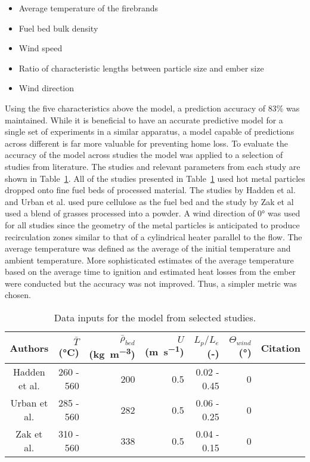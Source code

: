        \begin{itemize}
            \item Average temperature of the firebrands
            \item Fuel bed bulk density
            \item Wind speed
            \item Ratio of characteristic lengths between particle size and ember size
            \item Wind direction
        \end{itemize}
    Using the five characteristics above the model, a prediction accuracy of 83\% was maintained. While it is beneficial to have an accurate predictive model for a single set of experiments in a similar apparatus, a model capable of predictions across different is far more valuable for preventing home loss. To evaluate the accuracy of the model across studies the model was applied to a selection of studies from literature. The studies and relevant parameters from each study are shown in Table~\ref{tab:otherStudies}. All of the studies presented in Table~\ref{tab:otherStudies} used hot metal particles dropped onto fine fuel beds of processed material. The studies by Hadden et al. and Urban et al. used pure cellulose as the fuel bed and the study by Zak et al used a blend of grasses processed into a powder. A wind direction of 0\si{\degree} was used for all studies since the geometry of the metal particles is anticipated to produce recirculation zones similar to that of a cylindrical heater parallel to the flow. The average temperature was defined as the average of the initial temperature and ambient temperature. More sophisticated estimates of the average temperature based on the average time to ignition and estimated heat losses from the ember were conducted but the accuracy was not improved. Thus, a simpler metric was chosen.  
        \begin{table}[]
            \centering
            \caption{Data inputs for the model from selected studies.}
            \begin{tabular}{crrrrrc}
                Authors & $\bar{T}$ (\si{\celsius}) &  $\bar{\rho}_{bed}$ (\si{\kilo\gram\per\cubic\meter})& $U$ (\si{\meter\per\second}) & $L_{p}/L_{e}$ (-)& $\Theta_{wind}$ (\si{\degree}) & Citation\\
                \hline
                 Hadden et al. & 260 - 560 & 200 & 0.5 & 0.02 - 0.45 & 0 & \cite{Hadden2011}\\
                 Urban et al. & 285 - 560 & 282 & 0.5 & 0.06 - 0.25 & 0 & \cite{Urban2018}\\
                 Zak et al.    & 310 - 560 & 338 & 0.5 & 0.04 - 0.15 & 0 & \cite{Zak2014}
            \end{tabular}
            \label{tab:otherStudies}
        \end{table}

